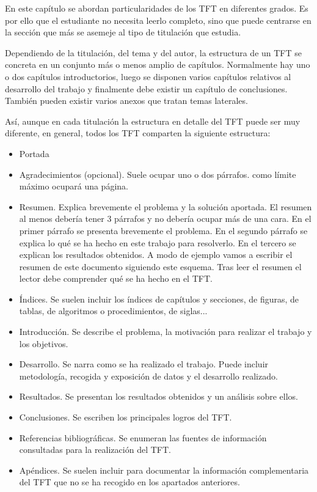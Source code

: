 \documentclass[12pt,spanish,chapterprefix, numbers=noenddot]{book}
\numberwithin{equation}{section}
\numberwithin{figure}{section}
\begin{document}
    En este capítulo se abordan particularidades de los TFT en diferentes
    grados. Es por ello que el estudiante no necesita leerlo completo,
    sino que puede centrarse en la sección que más se asemeje al tipo
    de titulación que estudia.

    Dependiendo de la titulación, del tema y del autor, la estructura
    de un TFT se concreta en un conjunto más o menos amplio de capítulos.
    Normalmente hay uno o dos capítulos introductorios, luego se disponen
    varios capítulos relativos al desarrollo del trabajo y finalmente
    debe existir un capítulo de conclusiones. También pueden existir varios
    anexos que tratan temas laterales.

    Así, aunque en cada titulación la estructura en detalle del TFT puede
    ser muy diferente, en general, todos los TFT comparten la siguiente
    estructura:
    \begin{itemize}
        \item Portada
        \item Agradecimientos (opcional). Suele ocupar uno o dos párrafos. como
        límite máximo ocupará una página.
        \item Resumen. Explica brevemente el problema y la solución aportada. El
        resumen al menos debería tener 3 párrafos y no debería ocupar más
        de una cara. En el primer párrafo se presenta brevemente el problema.
        En el segundo párrafo se explica lo qué se ha hecho en este trabajo
        para resolverlo. En el tercero se explican los resultados obtenidos.
        A modo de ejemplo vamos a escribir el resumen de este documento siguiendo
        este esquema. Tras leer el resumen el lector debe comprender qué se
        ha hecho en el TFT.
        \item Índices. Se suelen incluir los índices de capítulos y secciones, de
        figuras, de tablas, de algoritmos o procedimientos, de siglas...
        \item Introducción. Se describe el problema, la motivación para realizar
        el trabajo y los objetivos.
        \item Desarrollo. Se narra como se ha realizado el trabajo. Puede incluir
        metodología, recogida y exposición de datos y el desarrollo realizado.
        \item Resultados. Se presentan los resultados obtenidos y un análisis sobre
        ellos.
        \item Conclusiones. Se escriben los principales logros del TFT.
        \item Referencias bibliográficas. Se enumeran las fuentes de información
        consultadas para la realización del TFT.
        \item Apéndices. Se suelen incluir para documentar la información complementaria
        del TFT que no se ha recogido en los apartados anteriores.
    \end{itemize}
\end{document}
